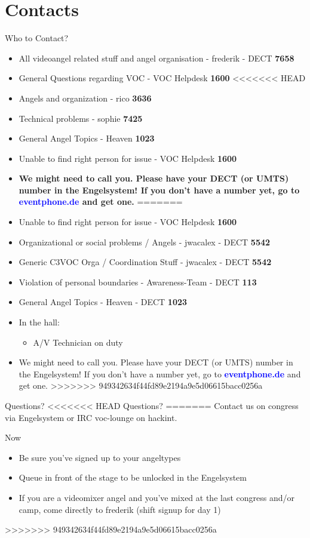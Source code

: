 \documentclass[aspectratio=169]{beamer}
\begin{document}
\section{Contacts}			
\begin{frame}{Who to Contact?}
\begin{itemize}
	\item All videoangel related stuff and angel organisation - frederik - DECT \textbf{7658}
	\item General Questions regarding VOC - VOC Helpdesk \textbf{1600}
<<<<<<< HEAD
	\item Angels and organization - rico \textbf{3636}
	\item Technical problems - sophie \textbf{7425}
	\item General Angel Topics - Heaven \textbf{1023}
	\item Unable to find right person for issue - VOC Helpdesk \textbf{1600}
	\item \textbf{We might need to call you. Please have your DECT (or UMTS) number in the Engelsystem! If you don't have a number yet, go to 
	\textcolor{blue}{\textbf{eventphone.de}} and get one.} 
=======
	\item Unable to find right person for issue - VOC Helpdesk \textbf{1600}
	\item Organizational or social problems / Angels - jwacalex - DECT \textbf{5542}
	\item Generic C3VOC Orga / Coordination Stuff - jwacalex - DECT \textbf{5542}
	\item Violation of personal boundaries - Awareness-Team - DECT \textbf{113}
	\item General Angel Topics - Heaven - DECT \textbf{1023}
	\item In the hall:
	\begin{itemize}
		\item A/V Technician on duty
	\end{itemize} 
	\item We might need to call you. Please have your DECT (or UMTS) number in the Engelsystem! If you don't have a number yet, go to 
	\textcolor{blue}{\textbf{eventphone.de}} and get one.
>>>>>>> 949342634f44fd89e2194a9e5d06615bacc0256a
\end{itemize} 
\end{frame}

\begin{frame}{Questions?}
<<<<<<< HEAD
Questions?
=======
Contact us on congress via Engelsystem or IRC voc-lounge on hackint.
\end{frame}

\begin{frame}{Now}
	\begin{itemize}
		\item Be sure you've signed up to your angeltypes
		\item Queue in front of the stage to be unlocked in the Engelsystem
		\item If you are a videomixer angel and you've mixed at the last congress and/or camp, come directly to frederik (shift signup for day 1)
	\end{itemize} 
>>>>>>> 949342634f44fd89e2194a9e5d06615bacc0256a
\end{frame}
\end{document}
